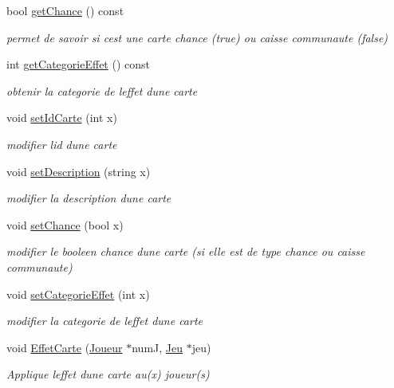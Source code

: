 \begin{DoxyCompactItemize}
bool \hyperlink{classCarte_aa058159c23995d0b6141b5980cb447bd}{get\+Chance} () const 
\begin{DoxyCompactList}\small\item\em permet de savoir si c\textquotesingle{}est une carte chance (true) ou caisse communaute (false) \end{DoxyCompactList}\item 
int \hyperlink{classCarte_afc964f1d9217dd904eebae13f49d518f}{get\+Categorie\+Effet} () const 
\begin{DoxyCompactList}\small\item\em obtenir la categorie de l\textquotesingle{}effet d\textquotesingle{}une carte \end{DoxyCompactList}\item 
void \hyperlink{classCarte_a3205ffb970d4aa96f50177a3cb2d2de0}{set\+Id\+Carte} (int x)
\begin{DoxyCompactList}\small\item\em modifier l\textquotesingle{}id d\textquotesingle{}une carte \end{DoxyCompactList}\item 
void \hyperlink{classCarte_aef1ba13573f1a362e436374c108b0406}{set\+Description} (string x)
\begin{DoxyCompactList}\small\item\em modifier la description d\textquotesingle{}une carte \end{DoxyCompactList}\item 
void \hyperlink{classCarte_a4c279260ee15a36b5eaea52df019c824}{set\+Chance} (bool x)
\begin{DoxyCompactList}\small\item\em modifier le booleen chance d\textquotesingle{}une carte (si elle est de type chance ou caisse communaute) \end{DoxyCompactList}\item 
void \hyperlink{classCarte_a7a32ab198e3f73c0b12f891779fd1424}{set\+Categorie\+Effet} (int x)
\begin{DoxyCompactList}\small\item\em modifier la categorie de l\textquotesingle{}effet d\textquotesingle{}une carte \end{DoxyCompactList}\item 
void \hyperlink{classCarte_a9597726842b3f036d37febbe2a94171d}{Effet\+Carte} (\hyperlink{classJoueur}{Joueur} $\ast$numJ, \hyperlink{classJeu}{Jeu} $\ast$jeu)
\begin{DoxyCompactList}\small\item\em Applique l\textquotesingle{}effet d\textquotesingle{}une carte au(x) joueur(s) \end{DoxyCompactList}\end{DoxyCompactItemize}


